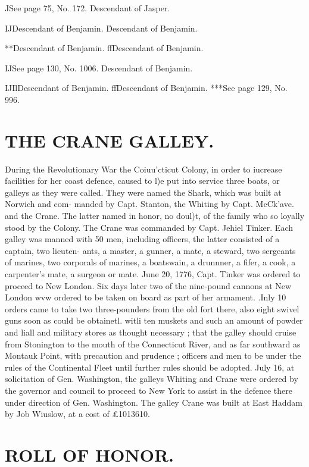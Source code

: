 JSee page 75, No. 172. Descendant of Jasper. 

IJDescendant of Benjamin. \^Descendant of Benjamin. 

**Descendant of Benjamin. ffDescendant of Benjamin. 

IJSee page 130, No. 1006. Descendant of Benjamin. 

IJIlDescendant of Benjamin. ffDescendant of Benjamin. 
***See page 129, No. 996. 



\chapter{THE CRANE GALLEY.}


During the Revolutionary War the Coiuu'cticut Colony, in 
order to iucrease facilities for her coast defence, caused to l)e 
put into service three boats, or galleys as they were called. They 
were named the Shark, which was built at Norwich and com- 
manded by Capt. Stanton, the Whiting by Capt. McCk'ave. and 
the Crane. The latter named in honor, no doul)t, of the family 
who so loyally stood by the Colony. The Crane was commanded 
by Capt. Jehiel Tinker. Each galley was manned with 50 men, 
including officers, the latter consisted of a captain, two lieuten- 
ants, a master, a gunner, a mate, a steward, two sergeants of 
marines, two corporals of marines, a boatswain, a drunnner, a 
fifer, a cook, a carpenter's mate, a surgeon or mate. June 20, 
1776, Capt. Tinker was ordered to proceed to New London. Six 
days later two of the nine-pound cannons at New London wvw 
ordered to be taken on board as part of her armament. .Inly 10 
orders came to take two three-pounders from the old fort there, 
also eight swivel guns soon as could be obtainetl. witli ten 
muskets and such an amount of powder and liall and military 
stores as thought necessary ; that the galley should cruise from 
Stonington to the mouth of the Connecticut River, and as far 
southward as Montauk Point, with precaution and prudence ; 
officers and men to be under the rules of the Continental Fleet 
until further rules should be adopted. July 16, at solicitation of 
Gen. Washington, the galleys Whiting and Crane were ordered 
by the governor and council to proceed to New York to assist in 
the defence there under direction of Gen. Washington. The 
galley Crane was built at East Haddam by Job Wiuslow, at a 
cost of £1013610. 



\chapter{ROLL OF HONOR.}


